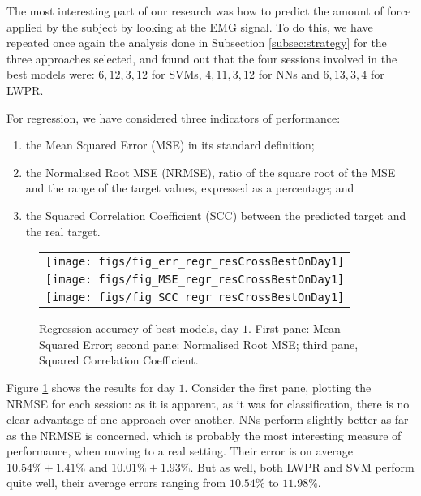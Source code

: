 The most interesting part of our research was how to predict the
amount of force applied by the subject by looking at the EMG
signal. To do this, we have repeated once again the analysis done in
Subsection \ref{subsec:strategy} for the three approaches selected,
and found out that the four sessions involved in the best models were:
$6,12,3,12$ for SVMs, $4,11,3,12$ for NNs and $6,13,3,4$ for LWPR.

For regression, we have considered three indicators of performance:

\begin{enumerate}

  \item the Mean Squared Error (MSE) in its standard definition;

  \item the Normalised Root MSE (NRMSE), ratio of the square root of
    the MSE and the range of the target values, expressed as a
    percentage; and

  \item the Squared Correlation Coefficient (SCC) between the
    predicted target and the real target.

\end{enumerate}

\begin{figure}\centering
  \begin{tabular}{c}
    \texttt{[image: figs/fig\_err\_regr\_resCrossBestOnDay1]}\\
    \texttt{[image: figs/fig\_MSE\_regr\_resCrossBestOnDay1]} \\
    \texttt{[image: figs/fig\_SCC\_regr\_resCrossBestOnDay1]} \\
  \end{tabular}
  \caption{Regression accuracy of best models, day $1$. First pane: Mean Squared Error; second
    pane: Normalised Root MSE; third pane, Squared Correlation Coefficient.}
  \label{fig:best_regr}
\end{figure}

Figure \ref{fig:best_regr} shows the results for day $1$. Consider the
first pane, plotting the NRMSE for each session: as it is apparent, as
it was for classification, there is no clear advantage of one approach
over another. NNs perform slightly better as far as the NRMSE is
concerned, which is probably the most interesting measure of
performance, when moving to a real setting. Their error is on average
$10.54\% \pm 1.41\%$ and $10.01\% \pm 1.93\%$. But as well, both LWPR
and SVM perform quite well, their average errors ranging from
$10.54\%$ to $11.98\%$.


